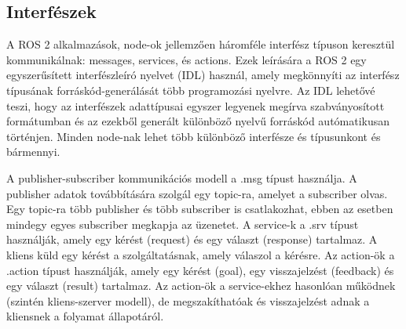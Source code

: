 \subsection{Interfészek}
A ROS 2 alkalmazások, node-ok jellemzően háromféle interfész típuson keresztül kommunikálnak: messages, services, és actions. Ezek leírására a ROS 2 egy egyszerűsített interfészleíró nyelvet (IDL) használ, amely megkönnyíti az interfész típusának forráskód-generálását több programozási nyelvre. Az IDL lehetővé teszi, hogy az interfészek adattípusai egyszer legyenek megírva szabványosított formátumban és az ezekből generált különböző nyelvű forráskód autómatikusan történjen. Minden node-nak lehet több különböző interfésze és típusunkont és bármennyi.

A publisher-subscriber kommunikációs modell a .msg típust használja. A publisher adatok továbbítására szolgál egy topic-ra, amelyet a subscriber olvas. Egy topic-ra több publisher és több subscriber is csatlakozhat, ebben az esetben mindegy egyes subscriber megkapja az üzenetet. A service-k a .srv típust használják, amely egy kérést (request) és egy választ (response) tartalmaz. A kliens küld egy kérést a szolgáltatásnak, amely válaszol a kérésre. Az action-ök a .action típust használják, amely egy kérést (goal), egy visszajelzést (feedback) és egy választ (result) tartalmaz. Az action-ök a service-ekhez hasonlóan működnek (szintén kliens-szerver modell), de megszakíthatóak és visszajelzést adnak a kliensnek a folyamat állapotáról. \cite{ros2} \cite{ros2_design}

